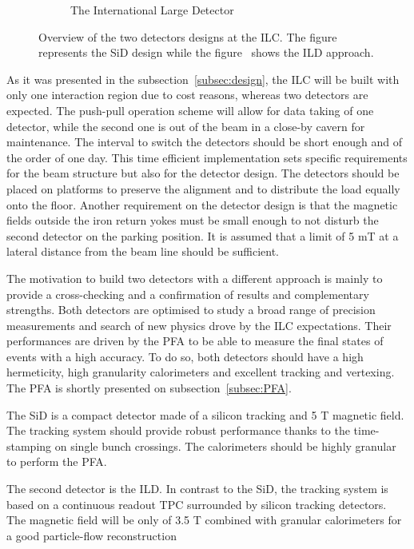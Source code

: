 \begin{figure}[!h]
\begin{subfigure}[t]{0.5\textwidth}
        \caption{\label{fig:ILD} The International Large Detector}
      \end{subfigure}
      \caption{Overview of the two detectors designs at the ILC. The figure~ represents the SiD design while the figure~ shows the ILD approach.\cite{Behnke2010}}
      \label{fig:SiD}
    \end{figure}    

  As it was presented in the subsection~\ref{subsec:design}, the \gls{ILC} will be built with only one interaction region due to cost reasons, whereas two detectors are expected.
  The push-pull operation scheme will allow for data taking of one detector, while the second one is out of the beam in a close-by cavern for maintenance.
  The interval to switch the detectors should be short enough and of the order of one day.
  This time efficient implementation sets specific requirements for the beam structure but also for the detector design.
  The detectors should be placed on platforms to preserve the alignment and to distribute the load equally onto the floor.
  Another requirement on the detector design is that the magnetic fields outside the iron return yokes must be small enough to not disturb the second detector on the parking position.
  It is assumed that a limit of 5 mT at a lateral distance from the beam line should be sufficient.

  The motivation to build two detectors with a different approach is mainly to provide a cross-checking and a confirmation of results and complementary strengths.
  Both detectors are optimised to study a broad range of precision measurements and search of new physics drove by the \gls{ILC} expectations.
  Their performances are driven by the \gls{PFA} to be able to measure the final states of events with a high accuracy.
  To do so, both detectors should have a high hermeticity, high granularity calorimeters and excellent tracking and vertexing.
  The \gls{PFA} is shortly presented on subsection~\ref{subsec:PFA}.

  The \gls{SiD} is a compact detector made of a silicon tracking and 5 T magnetic field.
  The tracking system should provide robust performance thanks to the time-stamping on single bunch crossings.
  The calorimeters should be highly granular to perform the \gls{PFA}.

  The second detector is the \gls{ILD}.
  In contrast to the \gls{SiD}, the tracking system is based on a continuous readout \gls{TPC} surrounded by silicon tracking detectors.
  The magnetic field will be only of 3.5 T combined with granular calorimeters for a good particle-flow reconstruction

